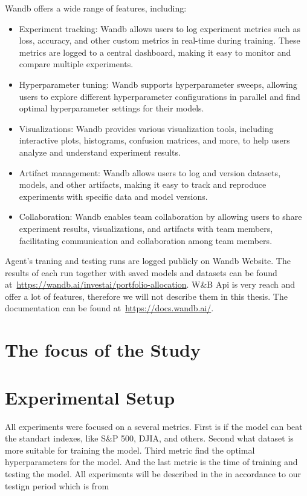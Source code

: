 \documentclass[../xlapes02]{subfiles}
\begin{document}
    Wandb offers a wide range of features, including:
    \begin{itemize}
        \item Experiment tracking: Wandb allows users to log experiment metrics such as loss, accuracy, and other custom metrics in real-time during training. These metrics are logged to a central dashboard, making it easy to monitor and compare multiple experiments.
        \item Hyperparameter tuning: Wandb supports hyperparameter sweeps, allowing users to explore different hyperparameter configurations in parallel and find optimal hyperparameter settings for their models.
        \item Visualizations: Wandb provides various visualization tools, including interactive plots, histograms, confusion matrices, and more, to help users analyze and understand experiment results.
        \item Artifact management: Wandb allows users to log and version datasets, models, and other artifacts, making it easy to track and reproduce experiments with specific data and model versions.
        \item Collaboration: Wandb enables team collaboration by allowing users to share experiment results, visualizations, and artifacts with team members, facilitating communication and collaboration among team members.
    \end{itemize}

    Agent's traning and testing runs are logged publicly on Wandb Website. The results of each run together with saved models and datasets can be found at~\url{https://wandb.ai/investai/portfolio-allocation}.
    W\&B Api is very reach and offer a lot of features, therefore we will not describe them in this thesis. The documentation can be found at~\url{https://docs.wandb.ai/}.


    \section{The focus of the Study}\label{sec:the-focus-of-the-study}


    \section{Experimental Setup}\label{sec:experimental-setup}
    All experiments were focused on a several metrics. First is if the model can beat the standart indexes, like S\&P 500, DJIA, and others. Second what dataset is more suitable for training the model. Third metric find the optimal hyperparameters for the model. And the last metric is the time of training and testing the model. All experiments will be described in the in accordance to our testign period which is from
\end{document}
